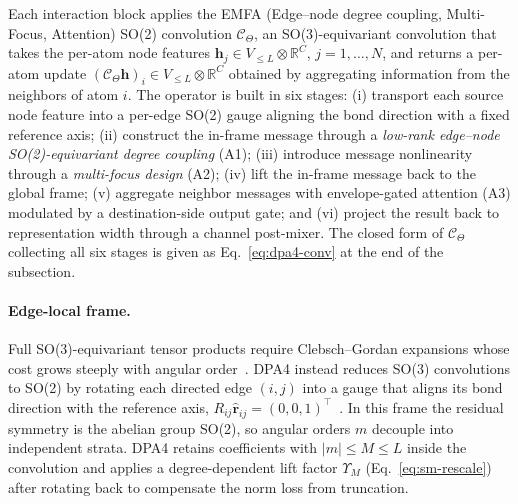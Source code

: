 Each interaction block applies the EMFA (Edge--node degree coupling, Multi-Focus, Attention) SO(2) convolution $\mathcal{C}_{\Theta}$, an SO(3)-equivariant convolution that takes the per-atom node features $\mathbf{h}_j\in V_{\le L}\otimes\mathbb{R}^{C}$, $j=1,\dots,N$, and returns a per-atom update $(\mathcal{C}_{\Theta}\mathbf{h})_i\in V_{\le L}\otimes\mathbb{R}^{C}$ obtained by aggregating information from the neighbors of atom $i$.
The operator is built in six stages: (i) transport each source node feature into a per-edge SO(2) gauge aligning the bond direction with a fixed reference axis; (ii) construct the in-frame message through a \emph{low-rank edge--node SO(2)-equivariant degree coupling} (A1); (iii) introduce message nonlinearity through a \emph{multi-focus design} (A2); (iv) lift the in-frame message back to the global frame; (v) aggregate neighbor messages with envelope-gated attention (A3) modulated by a destination-side output gate; and (vi) project the result back to representation width through a channel post-mixer.
The closed form of $\mathcal{C}_{\Theta}$ collecting all six stages is given as Eq.~\eqref{eq:dpa4-conv} at the end of the subsection.

\paragraph{Edge-local frame.}
Full SO(3)-equivariant tensor products require Clebsch--Gordan expansions whose cost grows steeply with angular order~\cite{batatia2022mace,liao2023equiformerv2}.
DPA4 instead reduces SO(3)
convolutions to SO(2) by rotating each directed edge $(i,j)$ into a gauge that
aligns its bond direction with the reference axis,
$R_{ij}\widehat{\mathbf{r}}_{ij}=(0,0,1)^{\top}$~\cite{passaro2023reducing}.
In this frame the residual symmetry is the abelian group SO(2), so angular orders $m$ decouple into independent strata.
DPA4 retains coefficients with $|m|\leq M\leq L$ inside the convolution and applies a degree-dependent lift factor $\Upsilon_M$ (Eq.~\eqref{eq:sm-rescale}) after rotating back to compensate the norm loss from truncation.

